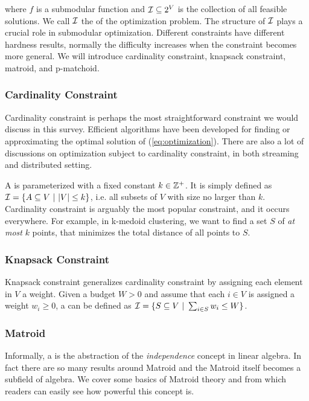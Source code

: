 where $f$ is a submodular function and $\mathcal{I} \subseteq 2^V$ is the collection of all feasible solutions. We call $\mathcal{I}$ the  of the optimization problem. The structure of $\mathcal{I}$ plays a crucial role in submodular optimization. Different constraints have different hardness results, normally the difficulty increases when the constraint becomes more general. We will introduce cardinality constraint, knapsack constraint, matroid, and p-matchoid.

\subsubsection{Cardinality Constraint}
Cardinality constraint is perhaps the most straightforward constraint we would discuss in this survey. Efficient algorithms have been developed for finding or approximating the optimal solution of (\ref{eq:optimization}). There are also a lot of discussions on optimization subject to cardinality constraint, in both streaming and distributed setting. 

A  is parameterized with a fixed constant $k \in \mathbb{Z}^+$. It is simply defined as $\mathcal{I} = \{A \subseteq V ~|~ |V| \leq k\}$, i.e. all subsets of $V$ with size no larger than $k$. Cardinality constraint is arguably the most popular constraint, and it occurs everywhere. For example, in k-medoid clustering, we want to find a set $S$ of \emph{at most} $k$ points, that minimizes the total distance of all points to $S$.  

\subsubsection{Knapsack Constraint}
Knapsack constraint generalizes cardinality constraint by assigning each element in $V$ a weight. Given a budget $W > 0$ and assume that each $i \in V$ is assigned a weight $w_i \geq 0$, a  can be defined as $\mathcal{I} = \{S \subseteq V ~|~ \sum_{i\in S} w_i \leq W \}$.


\subsubsection{Matroid}
Informally, a  is the abstraction of the \emph{independence} concept in linear algebra. In fact there are so many results around Matroid and the Matroid itself becomes a subfield of algebra. We cover some basics of Matroid theory and from which readers can easily see how powerful this concept is. 

